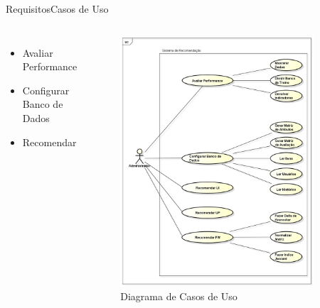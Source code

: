 \begin{frame}{Requisitos}{Casos de Uso}
\begin{columns}[c]
\begin{itemize}
	\item Avaliar Performance
	\item Configurar Banco de Dados
	\item Recomendar
\end{itemize}
\begin{figure}[ht]
    \begin{center}
    \includegraphics[width=0.9\textwidth]{img/CasosDeUso}
    \end{center}
\caption{Diagrama de Casos de Uso}
\end{figure}
\end{columns}
\end{frame}